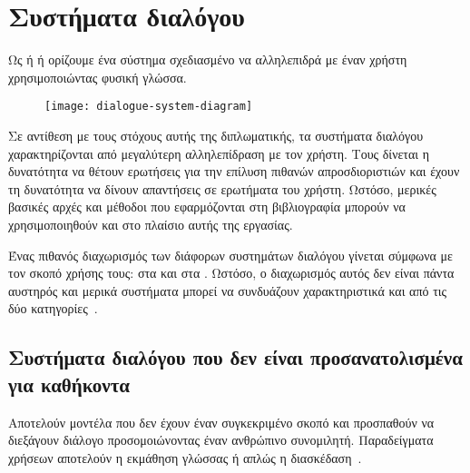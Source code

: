 \section{Συστήματα διαλόγου}
Ως 
ή 
ή 
ορίζουμε ένα σύστημα σχεδιασμένο να αλληλεπιδρά με έναν χρήστη χρησιμοποιώντας φυσική γλώσσα.

\begin{figure}
    \centering
    \texttt{[image: dialogue-system-diagram]}
    \label{fig:dialogue-system-diagram}
\end{figure}

Σε αντίθεση με τους στόχους αυτής της διπλωματικής, τα συστήματα διαλόγου χαρακτηρίζονται από μεγαλύτερη αλληλεπίδραση με τον χρήστη.
Τους δίνεται η δυνατότητα να θέτουν ερωτήσεις για την επίλυση πιθανών απροσδιοριστιών και έχουν τη δυνατότητα να δίνουν απαντήσεις σε ερωτήματα του χρήστη.
Ωστόσο, μερικές βασικές αρχές και μέθοδοι που εφαρμόζονται στη βιβλιογραφία μπορούν να χρησιμοποιηθούν και στο πλαίσιο αυτής της εργασίας.

Ένας πιθανός διαχωρισμός των διάφορων συστημάτων διαλόγου γίνεται σύμφωνα με τον σκοπό χρήσης τους:
στα 
και στα .
Ωστόσο, ο διαχωρισμός αυτός δεν είναι πάντα αυστηρός και μερικά συστήματα μπορεί να συνδυάζουν χαρακτηριστικά και από τις δύο κατηγορίες~\cite{wang2016recent}.

\subsection{Συστήματα διαλόγου που δεν είναι προσανατολισμένα για καθήκοντα}\label{subsec:non-goal-driven-dialogue-systems}%
Αποτελούν μοντέλα που δεν έχουν έναν συγκεκριμένο σκοπό και προσπαθούν να διεξάγουν διάλογο προσομοιώνοντας έναν ανθρώπινο συνομιλητή.
Παραδείγματα χρήσεων αποτελούν η εκμάθηση γλώσσας ή απλώς η διασκέδαση~\cite{shawar2007chatbots,serban2015hierarchical}.


